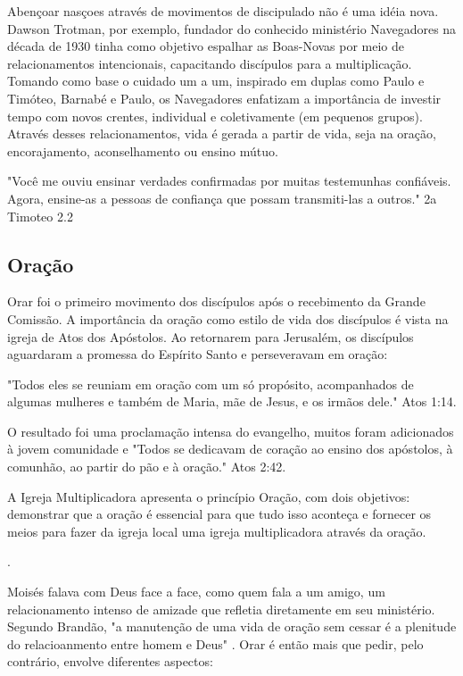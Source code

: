 \documentclass[
	12pt,				%
	openright,			%
	twoside,			%
	a4paper,			%
	english,			%
	french,				%
	spanish,			%
	brazil				%
	]{abntex2}
\begin{document}
Abençoar nasçoes através de movimentos de discipulado não é uma idéia nova. Dawson Trotman, por exemplo, fundador do conhecido ministério Navegadores na década de 1930 tinha como objetivo espalhar as Boas-Novas por meio de relacionamentos intencionais, capacitando discípulos para a multiplicação. Tomando como base o cuidado um a um, inspirado em duplas como Paulo e Timóteo,  Barnabé e Paulo, os Navegadores enfatizam a importância de investir tempo com novos crentes, individual e coletivamente (em pequenos grupos). Através desses relacionamentos, vida é gerada a partir de vida, seja na oração, encorajamento, aconselhamento ou ensino mútuo.\cite[21]{freitas} \begin{citacao}"Você me ouviu ensinar verdades confirmadas por muitas testemunhas confiáveis. Agora, ensine-as a pessoas de confiança que possam transmiti-las a outros." 2a Timoteo 2.2\end{citacao}


\subsection{Oração}

Orar foi o primeiro movimento dos discípulos após o recebimento da Grande Comissão\cite[28]{brandao}. A importância da oração como estilo de vida dos discípulos é vista na igreja de Atos dos Apóstolos. Ao retornarem para Jerusalém, os discípulos aguardaram a promessa do Espírito Santo e perseveravam em oração:

\begin{citacao}"Todos eles se reuniam em oração com um só propósito, acompanhados de algumas mulheres e também de Maria, mãe de Jesus, e os irmãos dele." Atos 1:14.\end{citacao}

O resultado foi uma proclamação intensa do evangelho, muitos foram adicionados à jovem comunidade e "Todos se dedicavam de coração ao ensino dos apóstolos, à comunhão, ao partir do pão e à oração." Atos 2:42. 

\begin{citacao}A Igreja Multiplicadora apresenta o princípio Oração, com dois objetivos: demonstrar que a oração é essencial para que tudo isso aconteça e fornecer os meios para fazer da igreja local uma igreja multiplicadora através da oração.\end{citacao}\cite[29]{brandao}.

Moisés falava com Deus face a face, como quem fala a um amigo, um relacionamento intenso de amizade que refletia diretamente em seu ministério. Segundo Brandão, "a manutenção de uma vida de oração sem cessar é a plenitude do relacioanmento entre homem e Deus" \cite[30]{brandao}. Orar é então mais que pedir, pelo contrário, envolve diferentes aspectos:
\end{document}
